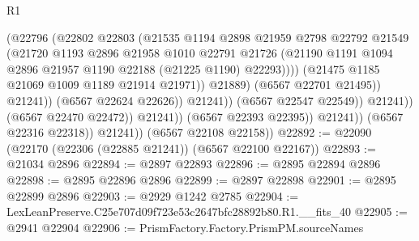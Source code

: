 \begin{lexlean}{R1}
\begin{coremodule}
                                            (@22796
                                              (@22802
                                                @22803
                                                (@21535
                                                  @1194
                                                  @2898
                                                  @21959
                                                  @2798
                                                  @22792
                                                  @21549
                                                  (@21720
                                                    @1193
                                                    @2896
                                                    @21958
                                                    @1010
                                                    @22791
                                                    @21726
                                                    (@21190
                                                      @1191
                                                      @1094
                                                      @2896
                                                      @21957
                                                      @1190
                                                      @22188
                                                      (@21225 @1190)
                                                      @22293))))
                                              (@21475 @1185 @21069 @1009 @1189 @21914 @21971))
                                            @21889)
                                          (@6567 @22701 @21495))
                                        @21241))
                                    (@6567 @22624 @22626))
                                  @21241))
                              (@6567 @22547 @22549))
                            @21241))
                        (@6567 @22470 @22472))
                      @21241))
                  (@6567 @22393 @22395))
                @21241))
            (@6567 @22316 @22318))
          @21241))
      (@6567 @22108 @22158))
@22892 := @22090 (@22170 (@22306 (@22885 @21241)) (@6567 @22100 @22167))
@22893 := @21034 @2896
@22894 := @2897 @22893
@22896 := @2895 @22894 @2896
@22898 := @2895 @22896 @2896
@22899 := @2897 @22898
@22901 := @2895 @22899 @2896
@22903 := @2929 @1242 @2785
@22904 := LexLeanPreserve.C25e707d09f723e53c2647bfc28892b80.R1.__fits_40
@22905 := @2941 @22904
@22906 := PrismFactory.Factory.PrismPM.sourceNames

\end{coremodule}
\end{lexlean}
